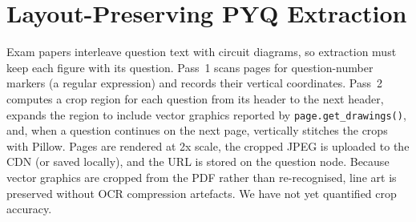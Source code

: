 \documentclass[conference]{IEEEtran}
\newcommand{\code}[1]{\texttt{\small #1}}
\begin{document}
\section{Layout-Preserving PYQ Extraction}\label{sec:pyq}
Exam papers interleave question text with circuit diagrams, so extraction must keep each figure with its question. Pass~1 scans pages for question-number markers (a regular expression) and records their vertical coordinates. Pass~2 computes a crop region for each question from its header to the next header, expands the region to include vector graphics reported by \code{page.get\_drawings()}, and, when a question continues on the next page, vertically stitches the crops with Pillow. Pages are rendered at 2x scale, the cropped JPEG is uploaded to the CDN (or saved locally), and the URL is stored on the question node. Because vector graphics are cropped from the PDF rather than re-recognised, line art is preserved without OCR compression artefacts. We have not yet quantified crop accuracy.
\end{document}
